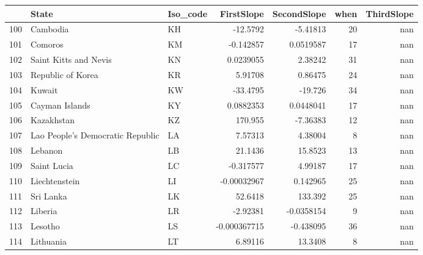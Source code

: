\begin{tabular}{rllrrrr}
\hline
     & State                                          & Iso\_code   &     FirstSlope &   SecondSlope &   when &   ThirdSlope \\
\hline
 100 & Cambodia                                       & KH         &  -12.5792      &   -5.41813    &     20 &          nan \\
 101 & Comoros                                        & KM         &   -0.142857    &    0.0519587  &     17 &          nan \\
 102 & Saint Kitts and Nevis                          & KN         &    0.0239055   &    2.38242    &     31 &          nan \\
 103 & Republic of Korea                              & KR         &    5.91708     &    0.86475    &     24 &          nan \\
 104 & Kuwait                                         & KW         &  -33.4795      &  -19.726      &     34 &          nan \\
 105 & Cayman Islands                                 & KY         &    0.0882353   &    0.0448041  &     17 &          nan \\
 106 & Kazakhstan                                     & KZ         &  170.955       &   -7.36383    &     12 &          nan \\
 107 & Lao People's Democratic Republic               & LA         &    7.57313     &    4.38004    &      8 &          nan \\
 108 & Lebanon                                        & LB         &   21.1436      &   15.8523     &     13 &          nan \\
 109 & Saint Lucia                                    & LC         &   -0.317577    &    4.99187    &     17 &          nan \\
 110 & Liechtenstein                                  & LI         &   -0.00032967  &    0.142965   &     25 &          nan \\
 111 & Sri Lanka                                      & LK         &   52.6418      &  133.392      &     25 &          nan \\
 112 & Liberia                                        & LR         &   -2.92381     &   -0.0358154  &      9 &          nan \\
 113 & Lesotho                                        & LS         &   -0.000367715 &   -0.438095   &     36 &          nan \\
 114 & Lithuania                                      & LT         &    6.89116     &   13.3408     &      8 &          nan \\

\end{tabular}
